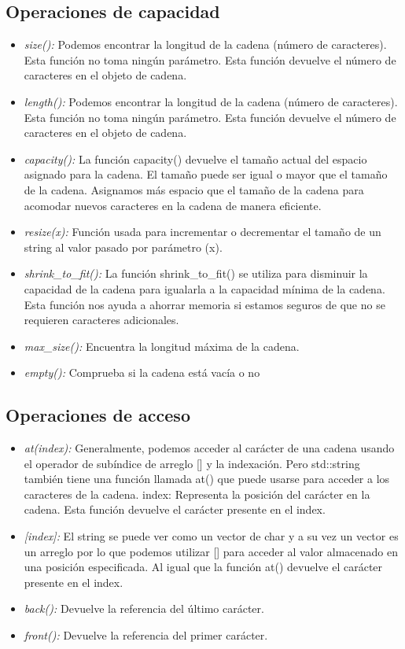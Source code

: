 \subsection{Operaciones de capacidad}
\begin{itemize}
	\item \emph{size():} Podemos encontrar la longitud de la cadena (número de caracteres). Esta función no toma ningún parámetro. Esta función devuelve el número de caracteres en el objeto de cadena.
	\item \emph{length():} Podemos encontrar la longitud de la cadena (número de caracteres). Esta función no toma ningún parámetro. Esta función devuelve el número de caracteres en el objeto de cadena.
	\item \emph{capacity():} La función capacity() devuelve el tamaño actual del espacio asignado para la cadena. El tamaño puede ser igual o mayor que el tamaño de la cadena. Asignamos más espacio que el tamaño de la cadena para acomodar nuevos caracteres en la cadena de manera eficiente.
	\item \emph{resize(x):} Función usada para incrementar o decrementar el tamaño de un string al valor pasado por parámetro (x).
	\item \emph{shrink\_to\_fit():} La función shrink\_to\_fit() se utiliza para disminuir la capacidad de la cadena para igualarla a la capacidad mínima de la cadena. Esta función nos ayuda a ahorrar memoria si estamos seguros de que no se requieren caracteres adicionales.
	\item \emph{max\_size():} Encuentra la longitud máxima de la cadena.
	\item \emph{empty():}  Comprueba si la cadena está vacía o no
\end{itemize}
\subsection{Operaciones de acceso}
\begin{itemize}
	\item \emph{at(index):} Generalmente, podemos acceder al carácter de una cadena usando el operador de subíndice de arreglo [] y la indexación. Pero std::string también tiene una función llamada at() que puede usarse para acceder a los caracteres de la cadena. index: Representa la posición del carácter en la cadena. Esta función devuelve el carácter presente en el index.
	\item \emph{[index]:} El string se puede ver como un vector de char y a su vez un vector es un arreglo por lo que podemos utilizar [] para acceder al valor almacenado en una posición especificada. Al igual que la función at() devuelve el carácter presente en el index.
	\item \emph{back():} Devuelve la referencia del último carácter. 
	\item \emph{front():} Devuelve la referencia del primer carácter.
\end{itemize}
